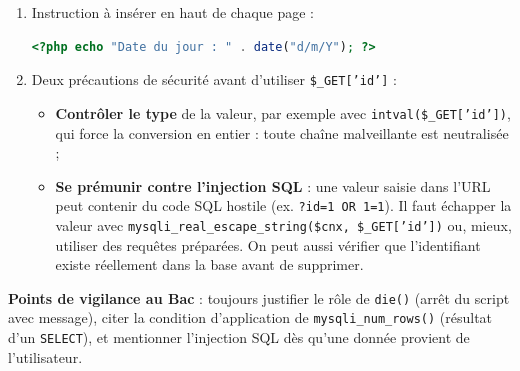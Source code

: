 \documentclass[11pt]{article}
\begin{document}
\begin{corrige}
\begin{enumerate}
\begin{lstlisting}[language=Php]
    $cnx = mysqli_connect("localhost", "root", "")
        or die("Echec de connexion");
    mysqli_select_db($cnx, "candidats_bac")
        or die("Base introuvable");

    // b) Requete de suppression ciblee
    $sql = "DELETE FROM candidat WHERE id = " . $id;
    $ok = mysqli_query($cnx, $sql);

    // c) Message de confirmation ou d'erreur
    if ($ok) {
        echo "Le candidat a ete supprime avec succes.";
    } else {
        echo "Erreur : la suppression a echoue.";
    }
    mysqli_close($cnx);
?>
\end{lstlisting}
La clause \texttt{WHERE id = ...} est indispensable : sans elle, \texttt{DELETE} viderait \emph{toute} la table.
\item Instruction à insérer en haut de chaque page :
\begin{lstlisting}[language=Php]
<?php echo "Date du jour : " . date("d/m/Y"); ?>
\end{lstlisting}
\item Deux précautions de sécurité avant d'utiliser \texttt{\$\_GET['id']} :
\begin{itemize}
\item \textbf{Contrôler le type} de la valeur, par exemple avec \texttt{intval(\$\_GET['id'])}, qui force la conversion en entier : toute chaîne malveillante est neutralisée ;
\item \textbf{Se prémunir contre l'injection SQL} : une valeur saisie dans l'URL peut contenir du code SQL hostile (ex. \texttt{?id=1 OR 1=1}). Il faut échapper la valeur avec \texttt{mysqli\_real\_escape\_string(\$cnx, \$\_GET['id'])} ou, mieux, utiliser des requêtes préparées. On peut aussi vérifier que l'identifiant existe réellement dans la base avant de supprimer.
\end{itemize}
\end{enumerate}
\textbf{Points de vigilance au Bac} : toujours justifier le rôle de \texttt{die()} (arrêt du script avec message), citer la condition d'application de \texttt{mysqli\_num\_rows()} (résultat d'un \texttt{SELECT}), et mentionner l'injection SQL dès qu'une donnée provient de l'utilisateur.
\end{corrige}
\end{document}
